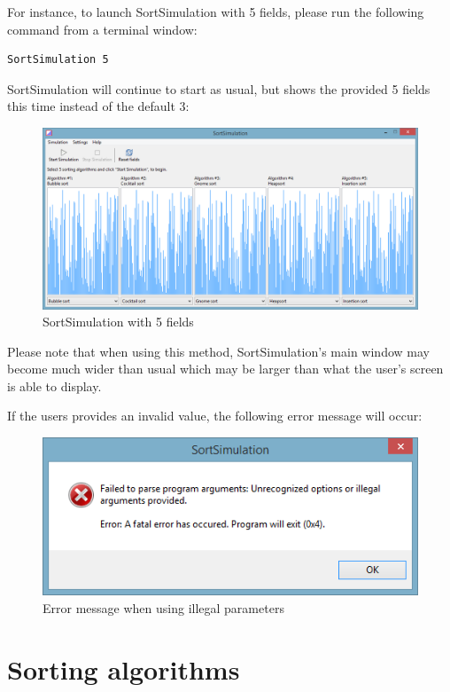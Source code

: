 \documentclass[]{pfBook}
\begin{document}
	For instance, to launch SortSimulation with 5 fields, please run the following command from a terminal window:
	
	\begin{lstlisting}[style=shell]
SortSimulation 5
	\end{lstlisting}
	
	SortSimulation will continue to start as usual, but shows the provided 5 fields this time instead of the default 3:
	
	\begin{figure}[h]
		\centering
		\includegraphics[scale=0.6]{images/image2.png}
		\caption{SortSimulation with 5 fields}
		\label{fig:5fields}
	\end{figure}
	
	Please note that when using this method, SortSimulation's main window may become much wider than usual which may be larger than what the user's screen is able to display.
	
	If the users provides an invalid value, the following error message will occur:
	
	\begin{figure}[h]
		\centering
		\includegraphics[scale=0.6]{images/image3.png}
		\caption{Error message when using illegal parameters}
		\label{fig:parameterserror}
	\end{figure}
	
	\section{Sorting algorithms}
	
\end{document}

